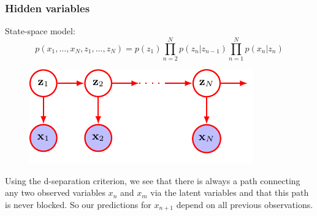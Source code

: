 \documentclass{beamer}
\begin{document}
\begin{frame}
    \frametitle{Hidden variables}
    State-space model:
    \begin{equation*}
        p(x_{1},\hdots,x_{N},z_{1},\hdots,z_{N})=p(z_{1})\prod_{n=2}^{N}p(z_{n}|z_{n-1})\prod_{n=1}^{N}p(x_{n}|z_{n})
    \end{equation*}
    \begin{figure}
        \includegraphics{Figure_31.pdf}
    \end{figure}
    Using the d-separation criterion, we see that there is always a path connecting any two observed variables $x_{n}$ and $x_{m}$ via the latent variables and that this path is never blocked. So our predictions for $x_{n+1}$ depend on all previous observations.
\end{frame}
\end{document}
